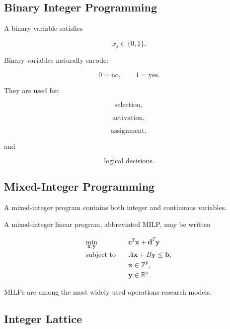 \subsection{Binary Integer Programming}
\label{subsec:binary-integer-programming}

A binary variable satisfies

\[
\boxed{
x_j\in\{0,1\}.
}
\]

Binary variables naturally encode:

\[
\boxed{
0=\text{no},
\qquad
1=\text{yes}.
}
\]

They are used for:

\[
\boxed{
\text{selection},
}
\]

\[
\boxed{
\text{activation},
}
\]

\[
\boxed{
\text{assignment},
}
\]

and

\[
\boxed{
\text{logical decisions}.
}
\]

\subsection{Mixed-Integer Programming}
\label{subsec:mixed-integer-programming}

A mixed-integer program contains both integer and continuous variables.

A mixed-integer linear program, abbreviated MILP, may be written

\[
\boxed{
\begin{aligned}
\min_{\mathbf{x},\mathbf{y}}
\quad&
\mathbf{c}^T\mathbf{x}
+
\mathbf{d}^T\mathbf{y}
\\
\text{subject to}
\quad&
A\mathbf{x}
+
B\mathbf{y}
\leq
\mathbf{b},
\\
&
\mathbf{x}\in\mathbb{Z}^p,
\\
&
\mathbf{y}\in\mathbb{R}^q.
\end{aligned}
}
\]

MILPs are among the most widely used operations-research models.

\subsection{Integer Lattice}
\label{subsec:integer-lattice}

